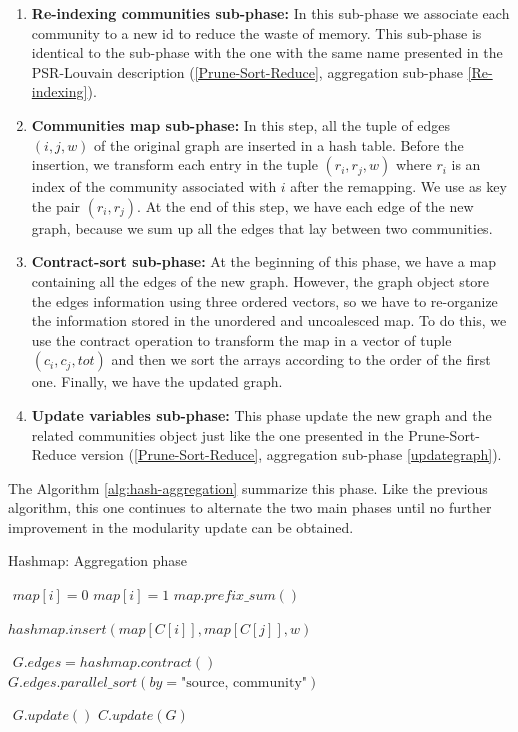 \begin{enumerate}
	\item \textbf{Re-indexing communities sub-phase:} In this sub-phase we associate each community to a new id to reduce the waste of memory. This sub-phase is identical to the sub-phase with the one with the same name presented in the PSR-Louvain description (\ref{Prune-Sort-Reduce}, aggregation sub-phase \ref{Re-indexing}). 
	\item \textbf{Communities map sub-phase:} In this step, all the tuple of edges $(i, j, w)$ of the original graph are inserted in a hash table. Before the insertion, we transform each entry in the tuple $(r_i, r_j, w)$ where $r_i$ is an index of the community associated with $i$ after the remapping. We use as key the pair $(r_i, r_j)$. At the end of this step, we have each edge of the new graph, because we sum up all the edges that lay between two communities.
	\item \textbf{Contract-sort sub-phase:} At the beginning of this phase, we have a map containing all the edges of the new graph. However, the graph object store the edges information using three ordered vectors, so we have to re-organize the information stored in the unordered and uncoalesced map. To do this, we use the contract operation to transform the map in a vector of tuple $(c_i, c_j, tot)$ and then we sort the arrays according to the order of the first one. Finally, we have the updated graph.
	\item \textbf{Update variables sub-phase:} This phase update the new graph and the related communities object just like the one presented in the Prune-Sort-Reduce version (\ref{Prune-Sort-Reduce}, aggregation sub-phase \ref{updategraph}).
\end{enumerate}
The Algorithm \ref{alg:hash-aggregation} summarize this phase. 
Like the previous algorithm, this one continues to alternate the two main phases until no further improvement in the modularity update can be obtained.
\begin{algorithm}
	\caption{Hashmap: Aggregation phase}\label{alg:hash-aggregation}
	\begin{algorithmic}
		\State $ $
		\State $map[i] = 0$
		\Else
		\State $map[i] = 1$
		\EndIf
		\EndFor 
		\State $map.prefix\_sum()$
		\State $ $
		
			\State $hashmap.insert(map[C[i]],map[C[j]],w)$
		\EndFor 
		
		\State $ $
		\State $G.edges = hashmap.contract()$
		\State $G.edges.parallel\_sort(by= \text{"source, community"})$
		\State 
		
		\State $ $
		\State $G.update()$
		\State $C.update(G)$
		
		\EndProcedure
	\end{algorithmic}
\end{algorithm}

